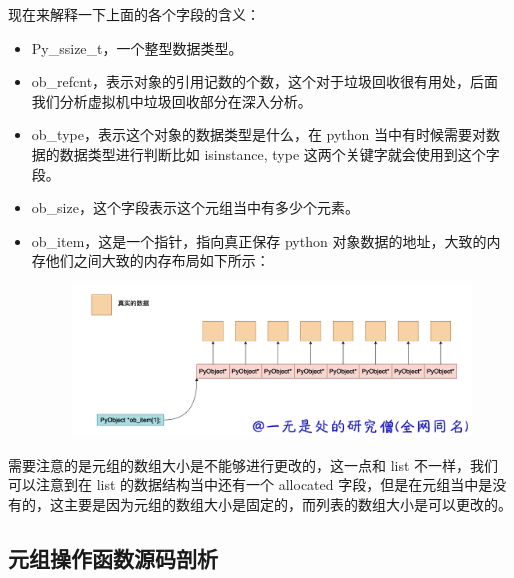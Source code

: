 现在来解释一下上面的各个字段的含义：
\begin{itemize}
\item Py\_ssize\_t，一个整型数据类型。 
\item ob\_refcnt，表示对象的引用记数的个数，这个对于垃圾回收很有用处，后面我们分析虚拟机中垃圾回收部分在深入分析。 
\item ob\_type，表示这个对象的数据类型是什么，在 python 当中有时候需要对数据的数据类型进行判断比如 isinstance, type 这两个关键字就会使用到这个字段。 
\item ob\_size，这个字段表示这个元组当中有多少个元素。 
\item ob\_item，这是一个指针，指向真正保存 python 对象数据的地址，大致的内存他们之间大致的内存布局如下所示： 

    \begin{figure}[H]
        \centering
            \includegraphics[scale=.3]{images/10-tuple.png}
            \caption{ }
        \label{fig:my_label}
    \end{figure}
    
\end{itemize}
需要注意的是元组的数组大小是不能够进行更改的，这一点和 list 不一样，我们可以注意到在 list 的数据结构当中还有一个 allocated 字段，但是在元组当中是没有的，这主要是因为元组的数组大小是固定的，而列表的数组大小是可以更改的。
\subsection{元组操作函数源码剖析}
